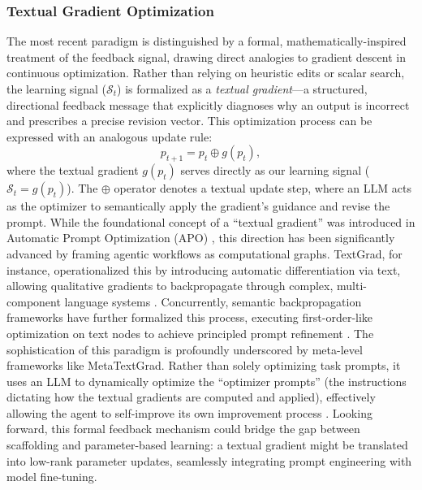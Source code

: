 \documentclass{article}
\begin{document}
\subsubsection{Textual Gradient Optimization}
\label{sec:Textual_Gradient_Optimization}
The most recent paradigm is distinguished by a formal, mathematically-inspired treatment of the feedback signal, drawing direct analogies to gradient descent in continuous optimization. Rather than relying on heuristic edits or scalar search, the learning signal ($\mathcal{S}_t$) is formalized as a \textit{textual gradient}—a structured, directional feedback message that explicitly diagnoses why an output is incorrect and prescribes a precise revision vector. This optimization process can be expressed with an analogous update rule:
\begin{equation}
p_{t+1} = p_t \oplus g(p_t),
\end{equation}
where the textual gradient $g(p_t)$ serves directly as our learning signal ($\mathcal{S}_t = g(p_t)$). The $\oplus$ operator denotes a textual update step, where an LLM acts as the optimizer to semantically apply the gradient's guidance and revise the prompt. While the foundational concept of a ``textual gradient'' was introduced in Automatic Prompt Optimization (APO) \citep{pryzant2023automaticpromptoptimizationgradient}, this direction has been significantly advanced by framing agentic workflows as computational graphs. TextGrad, for instance, operationalized this by introducing automatic differentiation via text, allowing qualitative gradients to backpropagate through complex, multi-component language systems \citep{yuksekgonul2024textgradautomaticdifferentiationtext}. Concurrently, semantic backpropagation frameworks have further formalized this process, executing first-order-like optimization on text nodes to achieve principled prompt refinement \citep{wang2024correctlysemanticbackpropagationlanguagebased}. The sophistication of this paradigm is profoundly underscored by meta-level frameworks like MetaTextGrad. Rather than solely optimizing task prompts, it uses an LLM to dynamically optimize the ``optimizer prompts'' (the instructions dictating how the textual gradients are computed and applied), effectively allowing the agent to self-improve its own improvement process \citep{xu2025metatextgradautomaticallyoptimizinglanguage}. Looking forward, this formal feedback mechanism could bridge the gap between scaffolding and parameter-based learning: a textual gradient might  be translated into low-rank parameter updates, seamlessly integrating prompt engineering with model fine-tuning.
\end{document}
